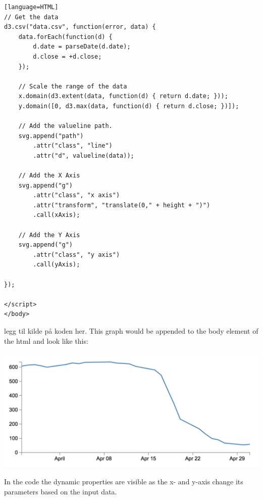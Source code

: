 \begin{lstlisting}[caption={Example of use of the D3.js framework}, label={lst:d3example}][language=HTML]
// Get the data
d3.csv("data.csv", function(error, data) {
    data.forEach(function(d) {
        d.date = parseDate(d.date);
        d.close = +d.close;
    });

    // Scale the range of the data
    x.domain(d3.extent(data, function(d) { return d.date; }));
    y.domain([0, d3.max(data, function(d) { return d.close; })]);

    // Add the valueline path.
    svg.append("path")
        .attr("class", "line")
        .attr("d", valueline(data));

    // Add the X Axis
    svg.append("g")
        .attr("class", "x axis")
        .attr("transform", "translate(0," + height + ")")
        .call(xAxis);

    // Add the Y Axis
    svg.append("g")
        .attr("class", "y axis")
        .call(yAxis);

});

</script>
</body>

\end{lstlisting}
legg til kilde på koden her.
This graph would be appended to the body element of the html and look like this:

\includegraphics[scale=0.5]{graph}

In the code the dynamic properties are visible as the x- and y-axis change its parameters based on the input data. 



